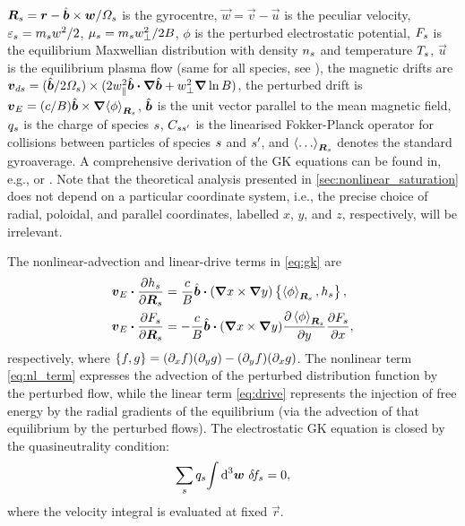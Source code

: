 \documentclass{jpp}
\begin{document}
\mbox{\(\boldsymbol{R}_s = \boldsymbol{r} - \hat{\boldsymbol{b}}\times\boldsymbol{w}/\varOmega_s\)} is the gyrocentre, \(\vec{w} = \vec{v} - \vec{u}\) is the peculiar velocity,  \mbox{\(\varepsilon_s = m_s w^2/2\)}, \mbox{\(\mu_s = m_s w_\perp^2 / 2B\)}, \(\phi\) is the perturbed electrostatic potential, \(F_{s}\) is the equilibrium Maxwellian distribution with density \(n_{s}\) and temperature \(T_{s}\), \(\vec{u}\) is the equilibrium plasma flow (same for all species, see \citealt{abel13}), the magnetic drifts are \mbox{\(\boldsymbol{v}_{ds} = (\hat{\boldsymbol{b}}/2\varOmega_s)\times(2w_\parallel^2 \hat{\boldsymbol{b}}\boldsymbol{\cdot}{\boldsymbol{\nabla}}\hat{\boldsymbol{b}} + w_\perp^2 {\boldsymbol{\nabla}} \ln B)\)}, the perturbed \exb{} drift is \mbox{\(\boldsymbol{v}_E = (c/ B) \hat{\boldsymbol{b}}\times {\boldsymbol{\nabla}} \! \left\langle \phi \right\rangle_{\boldsymbol{R}_s} \)}, \(\hat{\boldsymbol{b}}\) is the unit vector parallel to the mean magnetic field, \(q_s\) is the charge of species \(s\), \(C_{s s'}\) is the linearised Fokker-Planck operator for collisions between particles of species \(s\) and \(s'\), and \(\avgRs{\dots}\) denotes the standard gyroaverage. A comprehensive derivation of the GK equations can be found in, e.g., \citet{abel13} or \citet{catto2019}. Note that the theoretical analysis presented in \cref{sec:nonlinear_saturation} does not depend on a particular coordinate system, i.e., the precise choice of radial, poloidal, and parallel coordinates, labelled \(x\), \(y\), and \(z\), respectively, will be irrelevant.

The nonlinear-advection and linear-drive terms in \cref{eq:gk} are
\begin{align}
	\boldsymbol{v}_E \boldsymbol{\cdot} \frac{\partial h_s}{\partial \boldsymbol{R}_s} &= \frac{c}{B} \hat{\boldsymbol{b}} \boldsymbol{\cdot} ({\boldsymbol{\nabla}} x \times {\boldsymbol{\nabla}} y)  \left\lbrace \left\langle \phi \right\rangle_{\boldsymbol{R}_s}, h_s \right\rbrace, \label{eq:nl_term} \\
	\boldsymbol{v}_E \boldsymbol{\cdot} \frac{\partial F_{s}}{\partial \boldsymbol{R}_s} &= -\frac{c}{B} \hat{\boldsymbol{b}} \boldsymbol{\cdot} ({\boldsymbol{\nabla}} x \times {\boldsymbol{\nabla}} y)  \frac{\partial \left\langle \phi \right\rangle_{\boldsymbol{R}_s}}{\partial y} \frac{\partial F_{s}}{\partial x},
	\label{eq:drive}
\end{align}
respectively, where \(\lbrace f, g \rbrace = (\partial_x f) (\partial_y g) - (\partial_y f) (\partial_x g)\). The nonlinear term \cref{eq:nl_term} expresses the advection of the perturbed distribution function by the perturbed \exb{} flow, while the linear term \cref{eq:drive} represents the injection of free energy by the radial gradients of the equilibrium (via the advection of that equilibrium by the perturbed flows). The electrostatic GK equation is closed by the quasineutrality condition:
\begin{equation}
	\sum_s q_s {\int \text{d}^{3} \boldsymbol{w} \ } \delta \! f_{s} = 0,
	\label{eq:qn}
\end{equation}
where the velocity integral is evaluated at fixed \(\vec{r}\).
\end{document}
